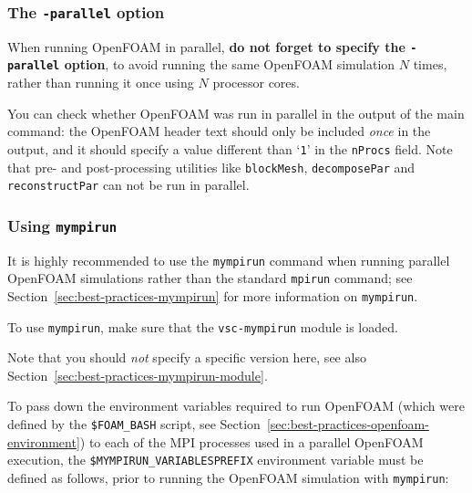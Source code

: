 \subsubsection{The {\small\texttt{-parallel}} option}

When running OpenFOAM in parallel, \textbf{do not forget to specify the \texttt{\small{-parallel}} option},
to avoid running the same OpenFOAM simulation $N$ times, rather than running it once using $N$ processor cores.

You can check whether OpenFOAM was run in parallel in the output of the main command:
the OpenFOAM header text should only be included \textit{once} in the output, and it should specify a value different
than `\texttt{\small{1}}' in the \texttt{\small{nProcs}} field. Note that pre- and post-processing utilities like
\texttt{\small{blockMesh}}, \texttt{\small{decomposePar}} and \texttt{\small{reconstructPar}} can not be run in parallel.

\subsubsection{Using \texttt{mympirun}}

It is highly recommended to use the {\small\texttt{mympirun}} command when running parallel OpenFOAM simulations
rather than the standard {\small\texttt{mpirun}} command;
see Section~\ref{sec:best-practices-mympirun} for more information on {\small\texttt{mympirun}}.

To use {\small\texttt{mympirun}}, make sure that the \texttt{\small{vsc-mympirun}} module is loaded.

\begin{prompt}
\end{prompt}

Note that you should \textit{not} specify a specific version here,
see also Section~\ref{sec:best-practices-mympirun-module}.

To pass down the environment variables required to run OpenFOAM (which were defined by the
\texttt{\small{\$FOAM\_BASH}} script, see Section~\ref{sec:best-practices-openfoam-environment})
to each of the MPI processes used in a parallel OpenFOAM execution,
the \texttt{\small{\$MYMPIRUN\_VARIABLESPREFIX}} environment variable must be defined as follows,
prior to running the OpenFOAM simulation with \texttt{\small{mympirun}}:

\begin{prompt}
\end{prompt}

